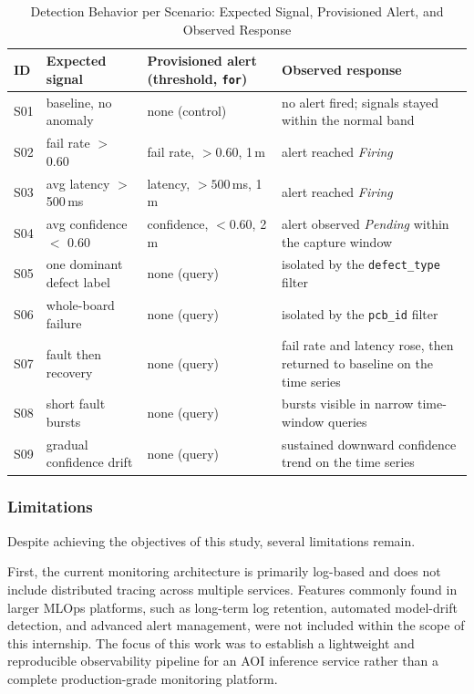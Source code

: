 \documentclass[12pt,a4paper]{article}
\begin{document}
\begin{table}[!ht]
\centering
\caption{Detection Behavior per Scenario: Expected Signal, Provisioned Alert, and Observed Response}
\label{tab:detection_latency}
\begin{tabular}{p{} p{} p{} p{}}
\toprule
\textbf{ID} & \textbf{Expected signal} & \textbf{Provisioned alert (threshold, \texttt{for})} & \textbf{Observed response} \\
\midrule
S01 & baseline, no anomaly & none (control) & no alert fired; signals stayed within the normal band \\
S02 & fail rate $>$ 0.60 & fail rate, $>0.60$, 1\,m & alert reached \emph{Firing} \\
S03 & avg latency $>$ 500\,ms & latency, $>500$\,ms, 1\,m & alert reached \emph{Firing} \\
S04 & avg confidence $<$ 0.60 & confidence, $<0.60$, 2\,m & alert observed \emph{Pending} within the capture window \\
S05 & one dominant defect label & none (query) & isolated by the \texttt{defect\_type} filter \\
S06 & whole-board failure & none (query) & isolated by the \texttt{pcb\_id} filter \\
S07 & fault then recovery & none (query) & fail rate and latency rose, then returned to baseline on the time series \\
S08 & short fault bursts & none (query) & bursts visible in narrow time-window queries \\
S09 & gradual confidence drift & none (query) & sustained downward confidence trend on the time series \\
\bottomrule
\end{tabular}
\end{table}

\subsubsection{Limitations}
Despite achieving the objectives of this study, several limitations remain.

First, the current monitoring architecture is primarily log-based and does not include distributed tracing across multiple services. Features commonly found in larger MLOps platforms, such as long-term log retention, automated model-drift detection, and advanced alert management, were not included within the scope of this internship. The focus of this work was to establish a lightweight and reproducible observability pipeline for an AOI inference service rather than a complete production-grade monitoring platform.
\end{document}
